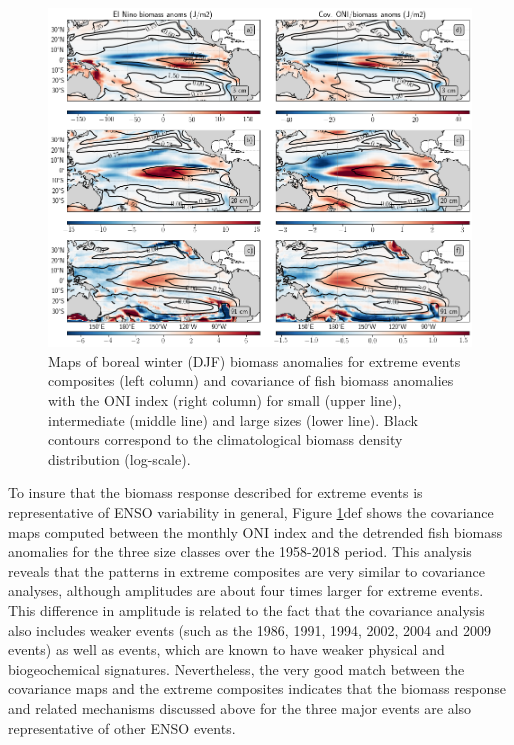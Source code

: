 \begin{figure}[h!tp]
	\centering
	\includegraphics[scale=0.4]{figs/map_mean_anom_OND_97.png}	
	\caption{Maps of boreal winter (DJF) biomass anomalies for extreme \nino{} events composites (left column) and covariance of fish biomass anomalies with the ONI index (right column) for small (upper line), intermediate (middle line) and large sizes (lower line). Black contours correspond to the climatological biomass density distribution (log-scale).}	
	\label{fig:mean_ond97_ape}
\end{figure}


To insure that the biomass response described for extreme \nino{} events is representative of ENSO variability in general, Figure \ref{fig:mean_ond97_ape}def shows the covariance maps computed between the monthly ONI index and the detrended fish biomass anomalies for the three size classes over the 1958-2018 period. This analysis reveals that the patterns in extreme \nino{} composites are very similar to covariance analyses, although amplitudes are about four times larger for extreme events. This  difference  in amplitude is related to the fact that the covariance analysis also includes weaker \nino{} events (such as the 1986, 1991, 1994, 2002, 2004 and 2009 events) as well as \nina{} events, which are known to have weaker physical and biogeochemical signatures. Nevertheless, the very good match between the covariance maps and the extreme \nino{} composites indicates that the biomass response and related mechanisms discussed above for the three major \nino{} events are also representative of other ENSO events.

